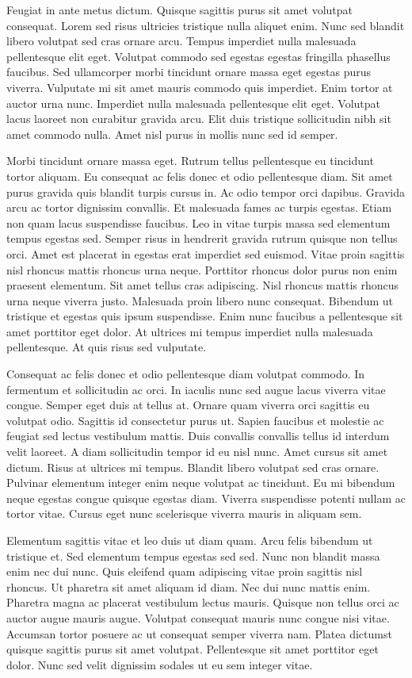 \documentclass[11pt,a4paper]{article}
\begin{document}
Feugiat in ante metus dictum. Quisque sagittis purus sit amet volutpat consequat. Lorem sed risus ultricies tristique nulla aliquet enim. Nunc sed blandit libero volutpat sed cras ornare arcu. Tempus imperdiet nulla malesuada pellentesque elit eget. Volutpat commodo sed egestas egestas fringilla phasellus faucibus. Sed ullamcorper morbi tincidunt ornare massa eget egestas purus viverra. Vulputate mi sit amet mauris commodo quis imperdiet. Enim tortor at auctor urna nunc. Imperdiet nulla malesuada pellentesque elit eget. Volutpat lacus laoreet non curabitur gravida arcu. Elit duis tristique sollicitudin nibh sit amet commodo nulla. Amet nisl purus in mollis nunc sed id semper.

Morbi tincidunt ornare massa eget. Rutrum tellus pellentesque eu tincidunt tortor aliquam. Eu consequat ac felis donec et odio pellentesque diam. Sit amet purus gravida quis blandit turpis cursus in. Ac odio tempor orci dapibus. Gravida arcu ac tortor dignissim convallis. Et malesuada fames ac turpis egestas. Etiam non quam lacus suspendisse faucibus. Leo in vitae turpis massa sed elementum tempus egestas sed. Semper risus in hendrerit gravida rutrum quisque non tellus orci. Amet est placerat in egestas erat imperdiet sed euismod. Vitae proin sagittis nisl rhoncus mattis rhoncus urna neque. Porttitor rhoncus dolor purus non enim praesent elementum. Sit amet tellus cras adipiscing. Nisl rhoncus mattis rhoncus urna neque viverra justo. Malesuada proin libero nunc consequat. Bibendum ut tristique et egestas quis ipsum suspendisse. Enim nunc faucibus a pellentesque sit amet porttitor eget dolor. At ultrices mi tempus imperdiet nulla malesuada pellentesque. At quis risus sed vulputate.

Consequat ac felis donec et odio pellentesque diam volutpat commodo. In fermentum et sollicitudin ac orci. In iaculis nunc sed augue lacus viverra vitae congue. Semper eget duis at tellus at. Ornare quam viverra orci sagittis eu volutpat odio. Sagittis id consectetur purus ut. Sapien faucibus et molestie ac feugiat sed lectus vestibulum mattis. Duis convallis convallis tellus id interdum velit laoreet. A diam sollicitudin tempor id eu nisl nunc. Amet cursus sit amet dictum. Risus at ultrices mi tempus. Blandit libero volutpat sed cras ornare. Pulvinar elementum integer enim neque volutpat ac tincidunt. Eu mi bibendum neque egestas congue quisque egestas diam. Viverra suspendisse potenti nullam ac tortor vitae. Cursus eget nunc scelerisque viverra mauris in aliquam sem.

Elementum sagittis vitae et leo duis ut diam quam. Arcu felis bibendum ut tristique et. Sed elementum tempus egestas sed sed. Nunc non blandit massa enim nec dui nunc. Quis eleifend quam adipiscing vitae proin sagittis nisl rhoncus. Ut pharetra sit amet aliquam id diam. Nec dui nunc mattis enim. Pharetra magna ac placerat vestibulum lectus mauris. Quisque non tellus orci ac auctor augue mauris augue. Volutpat consequat mauris nunc congue nisi vitae. Accumsan tortor posuere ac ut consequat semper viverra nam. Platea dictumst quisque sagittis purus sit amet volutpat. Pellentesque sit amet porttitor eget dolor. Nunc sed velit dignissim sodales ut eu sem integer vitae.
\end{document}
